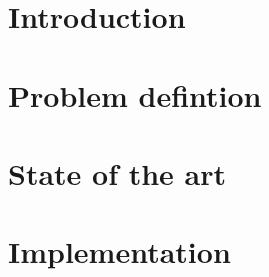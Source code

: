 






\chapter{Introduction}


\chapter{Problem defintion}


\chapter{State of the art}


\chapter{Implementation}



 



